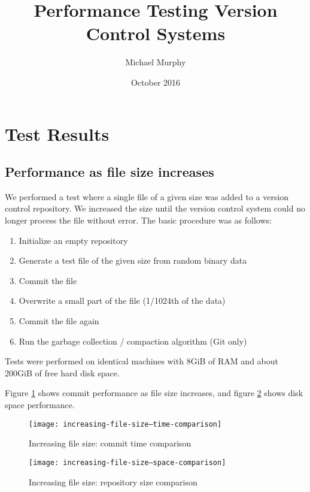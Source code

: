 \documentclass[a4paper]{article}
\begin{document}
\title{Performance Testing Version Control Systems}
\author{Michael Murphy}
\date{October 2016}
\maketitle

\section{Test Results}

\subsection{Performance as file size increases}

We performed a test where a single file of a given size was added to a version
control repository. We increased the size until the version control system could
no longer process the file without error. The basic procedure was as follows:

\begin{enumerate}
    \setlength{\itemsep}{0pt}
    \setlength{\parskip}{0pt}
    \setlength{\parsep}{0pt}
    \item Initialize an empty repository
    \item Generate a test file of the given size from random binary data
    \item Commit the file
    \item Overwrite a small part of the file (1/1024th of the data)
    \item Commit the file again
    \item Run the garbage collection / compaction algorithm (Git only)
\end{enumerate}

Tests were performed on identical machines with 8GiB of RAM and about 200GiB of
free hard disk space.

Figure \ref{fig:increasing-file-size--time-comparison} shows commit performance
as file size increases, and figure
\ref{fig:increasing-file-size--space-comparison} shows disk space performance.

\begin{figure}[h]
  \caption{Increasing file size: commit time comparison}
  \label{fig:increasing-file-size--time-comparison}
  \centering
    \texttt{[image: increasing-file-size--time-comparison]}
\end{figure}

\begin{figure}[h]
  \caption{Increasing file size: repository size comparison}
  \label{fig:increasing-file-size--space-comparison}
  \centering
    \texttt{[image: increasing-file-size--space-comparison]}
\end{figure}
\end{document}

